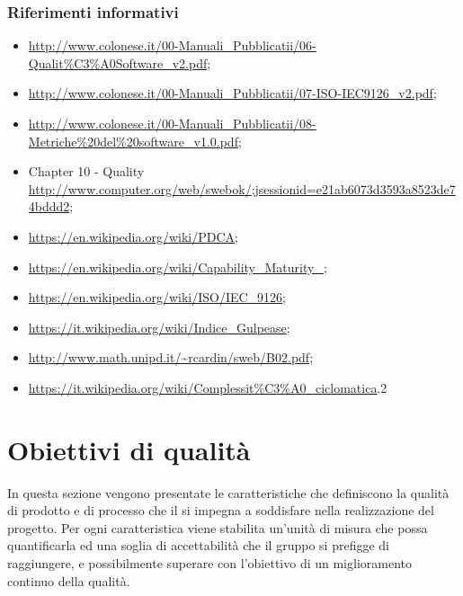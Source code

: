 \documentclass[a4paper, titlepage]{article}
\begin{document}
\subsubsection{Riferimenti informativi}
\label{rifinfo}
\begin{itemize}
\item {}
	\newline \url{http://www.colonese.it/00-Manuali_Pubblicatii/06-Qualit%C3%A0Software_v2.pdf};
\item {} 
	\newline \url{http://www.colonese.it/00-Manuali_Pubblicatii/07-ISO-IEC9126_v2.pdf};
\item {}
	\newline \url{http://www.colonese.it/00-Manuali_Pubblicatii/08-Metriche%20del%20software_v1.0.pdf};
\item {} Chapter 10 -  Quality
	\newline \url{http://www.computer.org/web/swebok/;jsessionid=e21ab6073d3593a8523de74bddd2};
\item {}
	\newline \url{https://en.wikipedia.org/wiki/PDCA};
\item {}
	\newline \url{https://en.wikipedia.org/wiki/Capability_Maturity_};
\item {}
	\newline \url{https://en.wikipedia.org/wiki/ISO/IEC_9126};
\item {}
	\newline \url{https://it.wikipedia.org/wiki/Indice_Gulpease};
\item {}
	\newline \url{http://www.math.unipd.it/~rcardin/sweb/B02.pdf};
\item {}
	\newline \url{https://it.wikipedia.org/wiki/Complessit%C3%A0_ciclomatica}.2
\end{itemize}

\newpage
\section{Obiettivi di qualità}
In questa sezione vengono presentate le caratteristiche che definiscono la qualità di prodotto e di processo che il  si impegna a soddisfare nella realizzazione del progetto. 
\newline Per ogni caratteristica viene stabilita un'unità di misura che possa quantificarla ed una soglia di accettabilità che il gruppo si prefigge di raggiungere, e possibilmente superare con l'obiettivo di un miglioramento continuo della qualità.
\end{document}
